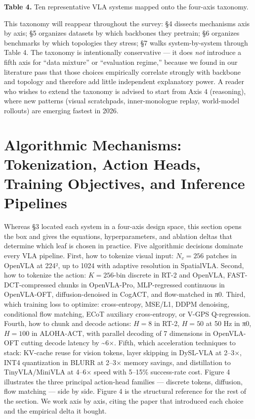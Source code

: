 \documentclass{article}
\begin{document}
\textbf{Table 4.} Ten representative VLA systems mapped onto the four-axis taxonomy.

This taxonomy will reappear throughout the survey: §4 dissects mechanisms axis by axis; §5 organizes datasets by which backbones they pretrain; §6 organizes benchmarks by which topologies they stress; §7 walks system-by-system through Table 4. The taxonomy is intentionally conservative --- it does \emph{not} introduce a fifth axis for ``data mixture'' or ``evaluation regime,'' because we found in our literature pass that those choices empirically correlate strongly with backbone and topology and therefore add little independent explanatory power. A reader who wishes to extend the taxonomy is advised to start from Axis 4 (reasoning), where new patterns (visual scratchpads, inner-monologue replay, world-model rollouts) are emerging fastest in 2026.

\section{Algorithmic Mechanisms: Tokenization, Action Heads, Training Objectives, and Inference Pipelines}\label{algorithmic-mechanisms-tokenization-action-heads-training-objectives-and-inference-pipelines}

Whereas §3 located each system in a four-axis design space, this section opens the box and gives the equations, hyperparameters, and ablation deltas that determine which leaf is chosen in practice. Five algorithmic decisions dominate every VLA pipeline. First, how to tokenize visual input: \(N_v=256\) patches in OpenVLA at 224², up to 1024 with adaptive resolution in SpatialVLA. Second, how to tokenize the action: \(K=256\)-bin discrete in RT-2 and OpenVLA, FAST-DCT-compressed chunks in OpenVLA-Pro, MLP-regressed continuous in OpenVLA-OFT, diffusion-denoised in CogACT, and flow-matched in π0. Third, which training loss to optimize: cross-entropy, MSE/L1, DDPM denoising, conditional flow matching, ECoT auxiliary cross-entropy, or V-GPS Q-regression. Fourth, how to chunk and decode actions: \(H=8\) in RT-2, \(H=50\) at 50 Hz in π0, \(H=100\) in ALOHA-ACT, with parallel decoding of 7 dimensions in OpenVLA-OFT cutting decode latency by \textasciitilde6×. Fifth, which acceleration techniques to stack: KV-cache reuse for vision tokens, layer skipping in DySL-VLA at 2--3×, INT4 quantization in BLURR at 2--3× memory savings, and distillation to TinyVLA/MiniVLA at 4--6× speed with 5--15\% success-rate cost. Figure 4 illustrates the three principal action-head families --- discrete tokens, diffusion, flow matching --- side by side. Figure 4 is the structural reference for the rest of the section. We work axis by axis, citing the paper that introduced each choice and the empirical delta it bought.
\end{document}
